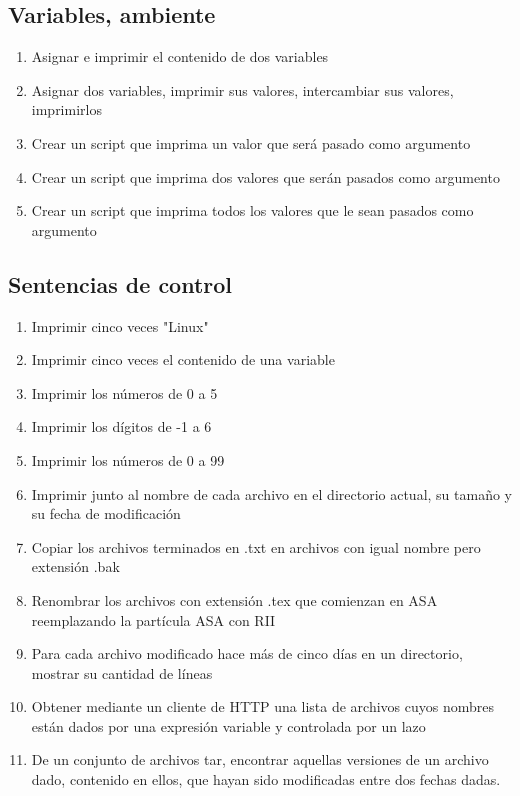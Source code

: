 \subsection {Variables, ambiente}
\begin{enumerate}
	\item Asignar e imprimir el contenido de dos variables
	\item Asignar dos variables, imprimir sus valores, intercambiar sus valores, imprimirlos
	\item Crear un script que imprima un valor que será pasado como argumento
	\item Crear un script que imprima dos valores que serán pasados como argumento
	\item Crear un script que imprima todos los valores que le sean pasados como argumento
\end{enumerate}


\subsection{Sentencias de control}
\begin{enumerate}
	\item 
Imprimir cinco veces "Linux"
	\item 
Imprimir cinco veces el contenido de una variable
	\item 
Imprimir los números de 0 a 5
	\item 
Imprimir los dígitos de -1 a 6
	\item 
Imprimir los números de 0 a 99
	\item 
Imprimir junto al nombre de cada archivo en el directorio actual, su tamaño y su fecha de modificación
	\item 
Copiar los archivos terminados en .txt en archivos con igual nombre pero extensión .bak
	\item 
Renombrar los archivos con extensión .tex que comienzan en ASA reemplazando la partícula ASA con RII
	\item 
Para cada archivo modificado hace más de cinco días en un directorio, mostrar su cantidad de líneas
	\item 
Obtener mediante un cliente de HTTP una lista de archivos cuyos nombres están dados por  una expresión variable y controlada por un lazo
	\item 
De un conjunto de archivos tar, encontrar aquellas versiones de un archivo dado, contenido en ellos, que hayan sido modificadas entre dos fechas dadas.
\end{enumerate}


